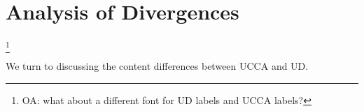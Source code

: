 \documentclass[11pt,a4paper]{article}
\newcommand{\oa}[1]{\footnote{\color{red}OA: #1}}
\begin{document}




\section{Analysis of Divergences}\label{sec:analysis}

\oa{what about a different font for UD labels and UCCA labels?}

We turn to discussing the content differences between UCCA and UD.
\end{document}
